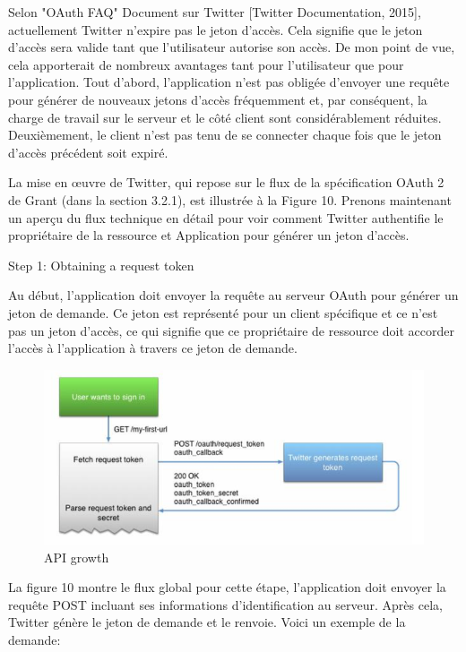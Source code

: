 Selon "OAuth FAQ" Document sur Twitter [Twitter Documentation, 2015], actuellement Twitter n'expire pas le jeton d'accès. Cela signifie que le jeton d'accès sera valide tant que l'utilisateur autorise son accès. De mon point de vue, cela apporterait de nombreux avantages tant pour l'utilisateur que pour l'application. Tout d'abord, l'application n'est pas obligée d'envoyer une requête pour générer de nouveaux jetons d'accès fréquemment et, par conséquent, la charge de travail sur le serveur et le côté client sont considérablement réduites. Deuxièmement, le client n'est pas tenu de se connecter chaque fois que le jeton d'accès précédent soit expiré.

La mise en œuvre de Twitter, qui repose sur le flux de la spécification OAuth 2 de Grant (dans la section 3.2.1), est illustrée à la Figure 10. Prenons maintenant un aperçu du flux technique en détail pour voir comment Twitter authentifie le propriétaire de la ressource et Application pour générer un jeton d'accès.

Step 1: Obtaining a request token 

Au début, l'application doit envoyer la requête au serveur OAuth pour générer un jeton de demande. Ce jeton est représenté pour un client spécifique et ce n'est pas un jeton d'accès, ce qui signifie que ce propriétaire de ressource doit accorder l'accès à l'application à travers ce jeton de demande.
\begin{figure}[! ht ]
			\centering
			\includegraphics[scale=.4]{./images/twitter_token_generation.png}
			\caption {API growth}
		\end{figure}
		
La figure 10 montre le flux global pour cette étape, l'application doit envoyer la requête POST incluant ses informations d'identification au serveur. Après cela, Twitter génère le jeton de demande et le renvoie. Voici un exemple de la demande:


